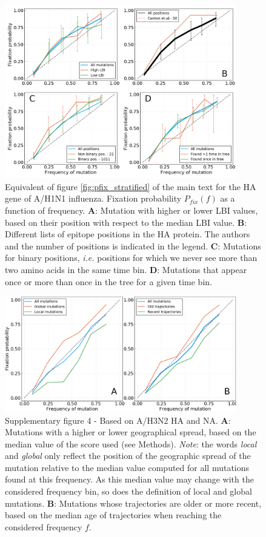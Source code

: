 \documentclass[reprint,amsmath,amssymb,superscriptaddress,showpacs,pre]{revtex4-1}
\begin{document}
	\begin{figure}
		\centering
		\includegraphics[width=0.9\textwidth]{./SM_figures/pfix_v_freq_strat_h1n1pdm.png}
		\caption{Equivalent of figure \ref{fig:pfix_stratified} of the main text for the HA gene of A/H1N1 influenza. Fixation probability $P_{fix}(f)$ as a function of frequency. \textbf{A}: Mutation with higher or lower LBI values, based on their position with respect to the median LBI value. \textbf{B}: Different lists of epitope positions in the HA protein. The authors and the number of positions is indicated in the legend. \textbf{C}: Mutations for binary positions, \emph{i.e.} positions for which we never see more than two amino acids in the same time bin. \textbf{D}: Mutations that appear once or more than once in the tree for a given time bin.}
		\label{fig:pfix_stratified_h1n1}
	\end{figure}

	\begin{figure}
		\centering
		\includegraphics[width=0.9\textwidth]{SM_figures/geospread_and_time_h3n2.png}
		\caption{Supplementary figure 4 - Based on A/H3N2 HA and NA. \textbf{A}: Mutations with a higher or lower geographical spread, based on the median value of the score used (see Methods). \emph{Note}: the words \emph{local} and \emph{global} only reflect the position of the geographic spread of the mutation relative to the median value computed for all mutations found at this frequency. As this median value may change with the considered frequency bin, so does the definition of local and global mutations. \textbf{B}: Mutations whose trajectories are older or more recent, based on the median age of trajectories when reaching the considered frequency $f$.}
		\label{fig:geospread_and_time_h3n2}
	\end{figure}
\end{document}
